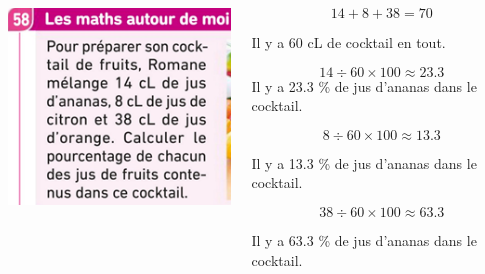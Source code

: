\documentclass[xcolor={dvipsnames}]{beamer}
\begin{document}
\begin{frame}
	
	\begin{columns}
		\begin{column}{0.5\textwidth}
			\begin{center}
				\includegraphics[scale=0.8]{ex58}
			\end{center}\pause
		\end{column}
		\begin{column}{0.5\textwidth}
			\begin{equation*}
				14 + 8 + 38 = 70
			\end{equation*}
		
		Il y a 60 cL de cocktail en tout. \pause
		
		\begin{equation*}
			14 \div \num{60} \times 100 \approx \num{23.3} 
		\end{equation*}		
		Il y a \num{23.3} \% de jus d'ananas dans le cocktail. \pause
		
		\begin{equation*}
			8 \div \num{60} \times 100 \approx \num{13.3} 
		\end{equation*}
	
		Il y a \num{13.3} \% de jus d'ananas dans le cocktail. \pause
		
		\begin{equation*}
			38 \div \num{60} \times 100 \approx \num{63.3} 
		\end{equation*}
		
		Il y a \num{63.3} \% de jus d'ananas dans le cocktail.
		
		\end{column}
		
	\end{columns}
	
	
	
\end{frame}
\end{document}
